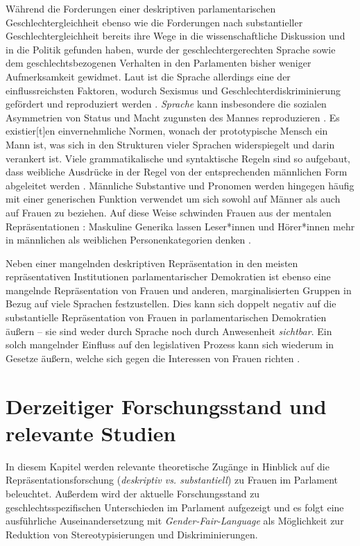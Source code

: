 \documentclass[12pt, 
    twoside=false, 
    bibliography=totoc, 
    numbers=endperiod, 
    headings=normal, 
    toc=chapterentrydotfill
    ]{scrbook}
\begin{document}
Während die Forderungen einer deskriptiven parlamentarischen Geschlechtergleichheit ebenso wie die Forderungen nach substantieller Geschlechtergleichheit bereits ihre Wege in die wissenschaftliche Diskussion und in die Politik gefunden haben, wurde der geschlechtergerechten Sprache sowie dem geschlechtsbezogenen Verhalten in den Parlamenten bisher weniger Aufmerksamkeit gewidmet. 
Laut \textcite{menegatti_2017} ist die Sprache allerdings eine der einflussreichsten Faktoren, wodurch Sexismus und Geschlechterdiskriminierung gefördert und reproduziert werden \parencite*[1]{menegatti_2017}. \emph{Sprache} kann insbesondere die sozialen Asymmetrien von Status und Macht zugunsten des Mannes reproduzieren \parencite[1]{menegatti_2017}. Es existier[t]en einvernehmliche Normen, wonach der prototypische Mensch ein Mann ist, was sich in den Strukturen vieler Sprachen widerspiegelt und darin verankert ist. Viele grammatikalische und syntaktische Regeln sind so aufgebaut, dass weibliche Ausdrücke in der Regel von der entsprechenden männlichen Form abgeleitet werden \parencite*[1]{menegatti_2017}. Männliche Substantive und Pronomen werden hingegen häufig mit einer generischen Funktion verwendet um sich sowohl auf Männer als auch auf Frauen zu beziehen. Auf diese Weise schwinden Frauen aus der mentalen Repräsentationen \parencites{vaughan_2018}{stahlberg_2001}: Maskuline Generika lassen Leser*innen und Hörer*innen mehr in männlichen als weiblichen Personenkategorien denken \parencites[2]{sczesny_2016}{stahlberg_2007}.

Neben einer mangelnden deskriptiven Repräsentation in den meisten repräsentativen Institutionen parlamentarischer Demokratien \parencite[vgl.][]{ipu_2019} ist ebenso eine mangelnde Repräsentation von Frauen und anderen, marginalisierten Gruppen in Bezug auf viele Sprachen festzustellen. Dies kann sich doppelt negativ auf die substantielle Repräsentation von Frauen in parlamentarischen Demokratien äußern -- sie sind weder durch Sprache noch durch Anwesenheit \emph{sichtbar}. Ein solch mangelnder Einfluss auf den legislativen Prozess kann sich wiederum in Gesetze äußern, welche sich gegen die Interessen von Frauen richten \parencite[2]{back_2018}.


\section {Derzeitiger Forschungsstand und relevante Studien}

In diesem Kapitel werden relevante theoretische Zugänge in Hinblick auf die Repräsentationsforschung (\emph{deskriptiv vs. substantiell}) zu Frauen im Parlament beleuchtet. Außerdem wird der aktuelle Forschungsstand zu geschlechtsspezifischen Unterschieden im Parlament aufgezeigt und es folgt eine ausführliche Auseinandersetzung mit \emph{Gender-Fair-Language} als Möglichkeit zur Reduktion von Stereotypisierungen und Diskriminierungen.  
\end{document}
